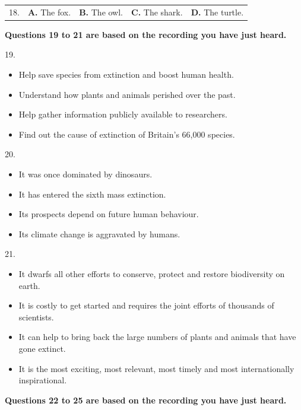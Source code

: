 \documentclass[UTF8,11pt]{ctexart}
\begin{document}
\noindent\begin{tabularx}{\linewidth}{@{}lXXXX@{}}18. & \textbf{A.} The fox. & \textbf{B.} The owl. & \textbf{C.} The shark. & \textbf{D.} The turtle.\\\end{tabularx}\par

\textbf{Questions 19 to 21 are based on the recording you have just heard.}


19.


\begin{itemize}[leftmargin=2em,itemsep=.2em,topsep=.4em]\item[A.] Help save species from extinction and boost human health.
\item[B.] Understand how plants and animals perished over the past.
\item[C.] Help gather information publicly available to researchers.
\item[D.] Find out the cause of extinction of Britain’s 66,000 species.
\end{itemize}

20.


\begin{itemize}[leftmargin=2em,itemsep=.2em,topsep=.4em]\item[A.] It was once dominated by dinosaurs.
\item[B.] It has entered the sixth mass extinction.
\item[C.] Its prospects depend on future human behaviour.
\item[D.] Its climate change is aggravated by humans.
\end{itemize}

21.


\begin{itemize}[leftmargin=2em,itemsep=.2em,topsep=.4em]\item[A.] It dwarfs all other efforts to conserve, protect and restore biodiversity on earth.
\item[B.] It is costly to get started and requires the joint efforts of thousands of scientists.
\item[C.] It can help to bring back the large numbers of plants and animals that have gone extinct.
\item[D.] It is the most exciting, most relevant, most timely and most internationally inspirational.
\end{itemize}

\textbf{Questions 22 to 25 are based on the recording you have just heard.}
\end{document}
